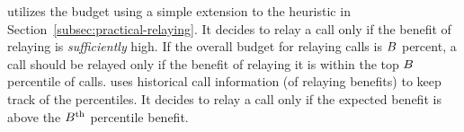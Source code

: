 \hybrid utilizes the budget using a simple extension to the heuristic in Section~\ref{subsec:practical-relaying}. It decides to relay a call only if the benefit of relaying is {\em sufficiently} high. 
If the {overall} budget for relaying calls is $B$ {percent}, a call should be relayed only if the benefit of relaying it is within the top $B$ percentile of calls. 
\hybrid uses historical call information (of relaying benefits) to keep track of the percentiles. It decides to relay a call only if the expected benefit is above the $B^\text{th}$ percentile benefit.




